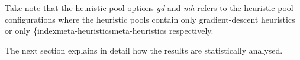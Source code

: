 \begin{table}[htbp]
      \centering
      \caption{BHH variants and their configuration}
      \label{tab:methodology:experiments:bhh_variants}%
      \par\bigskip
\end{table}%

Take note that the heuristic pool options \textit{gd} and \textit{mh} refers to the heuristic pool configurations where the heuristic pools contain only gradient-descent heuristics or only \{index{meta-heuristics}meta-heuristics  respectively.

The next section explains in detail how the results are statistically analysed.

